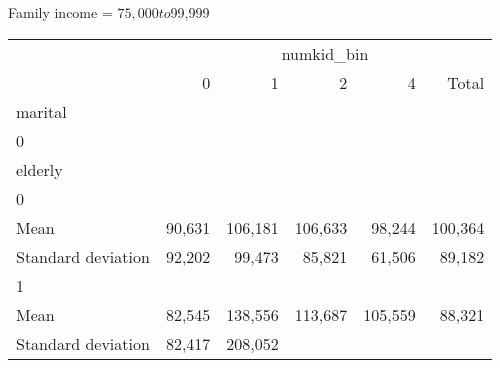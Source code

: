 Family income = $75,000 to $99,999
\begin{tabular}{llllll}
\cline{1-6}
\multicolumn{1}{c}{} &
  \multicolumn{5}{|c}{numkid\_bin} \\
\multicolumn{1}{c}{} &
  \multicolumn{1}{|r}{0} &
  \multicolumn{1}{r}{1} &
  \multicolumn{1}{r}{2} &
  \multicolumn{1}{r}{4} &
  \multicolumn{1}{r}{Total} \\
\cline{1-6}
\multicolumn{1}{l}{marital} &
  \multicolumn{1}{|r}{} &
  \multicolumn{1}{r}{} &
  \multicolumn{1}{r}{} &
  \multicolumn{1}{r}{} &
  \multicolumn{1}{r}{} \\
\multicolumn{1}{l}{\hspace{1em}0} &
  \multicolumn{1}{|r}{} &
  \multicolumn{1}{r}{} &
  \multicolumn{1}{r}{} &
  \multicolumn{1}{r}{} &
  \multicolumn{1}{r}{} \\
\multicolumn{1}{l}{\hspace{2em}elderly} &
  \multicolumn{1}{|r}{} &
  \multicolumn{1}{r}{} &
  \multicolumn{1}{r}{} &
  \multicolumn{1}{r}{} &
  \multicolumn{1}{r}{} \\
\multicolumn{1}{l}{\hspace{3em}0} &
  \multicolumn{1}{|r}{} &
  \multicolumn{1}{r}{} &
  \multicolumn{1}{r}{} &
  \multicolumn{1}{r}{} &
  \multicolumn{1}{r}{} \\
\multicolumn{1}{l}{\hspace{4em}Mean} &
  \multicolumn{1}{|r}{90,631} &
  \multicolumn{1}{r}{106,181} &
  \multicolumn{1}{r}{106,633} &
  \multicolumn{1}{r}{98,244} &
  \multicolumn{1}{r}{100,364} \\
\multicolumn{1}{l}{\hspace{4em}Standard deviation} &
  \multicolumn{1}{|r}{92,202} &
  \multicolumn{1}{r}{99,473} &
  \multicolumn{1}{r}{85,821} &
  \multicolumn{1}{r}{61,506} &
  \multicolumn{1}{r}{89,182} \\
\multicolumn{1}{l}{\hspace{3em}1} &
  \multicolumn{1}{|r}{} &
  \multicolumn{1}{r}{} &
  \multicolumn{1}{r}{} &
  \multicolumn{1}{r}{} &
  \multicolumn{1}{r}{} \\
\multicolumn{1}{l}{\hspace{4em}Mean} &
  \multicolumn{1}{|r}{82,545} &
  \multicolumn{1}{r}{138,556} &
  \multicolumn{1}{r}{113,687} &
  \multicolumn{1}{r}{105,559} &
  \multicolumn{1}{r}{88,321} \\
\multicolumn{1}{l}{\hspace{4em}Standard deviation} &
  \multicolumn{1}{|r}{82,417} &
  \multicolumn{1}{r}{208,052} &

\end{tabular}
